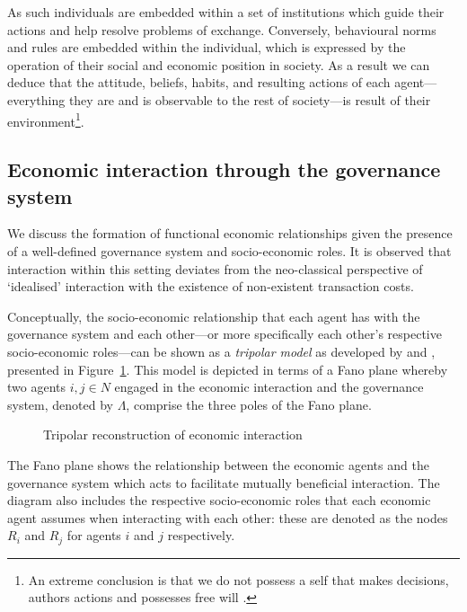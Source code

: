 As such individuals are embedded within a set of institutions which guide their actions and help resolve problems of exchange. Conversely, behavioural norms and rules are embedded within the individual, which is expressed by the operation of their social and economic position in society. As a result we can deduce that the attitude, beliefs, habits, and resulting actions of each agent---everything they are and is observable to the rest of society---is result of their environment\footnote{An extreme conclusion is that we do not possess a self that makes decisions, authors actions and possesses free will \citep{Hood2013}.}.

\subsection{Economic interaction through the governance system} \label{interactionGovernanceSystem}

We discuss the formation of functional economic relationships given the presence of a well-defined governance system and socio-economic roles. It is observed that interaction within this setting deviates from the neo-classical perspective of `idealised' interaction with the existence of non-existent transaction costs.

Conceptually, the socio-economic relationship that each agent has with the governance system and each other---or more specifically each other's respective socio-economic roles---can be shown as a \textit{tripolar model} as developed by \citet{Ruys1981} and \citet{Gilles1990}, presented in Figure~\ref{fig:governance}. This model is depicted in terms of a Fano plane whereby two agents $i,j \in N$ engaged in the economic interaction and the governance system, denoted by $\Lambda$, comprise the three poles of the Fano plane.
\begin{figure}[t]
\begin{center}
\end{center}
\caption[Tripolar reconstruction of economic interaction]{Tripolar reconstruction of economic interaction}
\label{fig:governance}
\end{figure}
The Fano plane shows the relationship between the economic agents and the governance system which acts to facilitate mutually beneficial interaction. The diagram also includes the respective socio-economic roles that each economic agent assumes when interacting with each other: these are denoted as the nodes $R_{i}$ and $R_{j}$ for agents $i$ and $j$ respectively.

